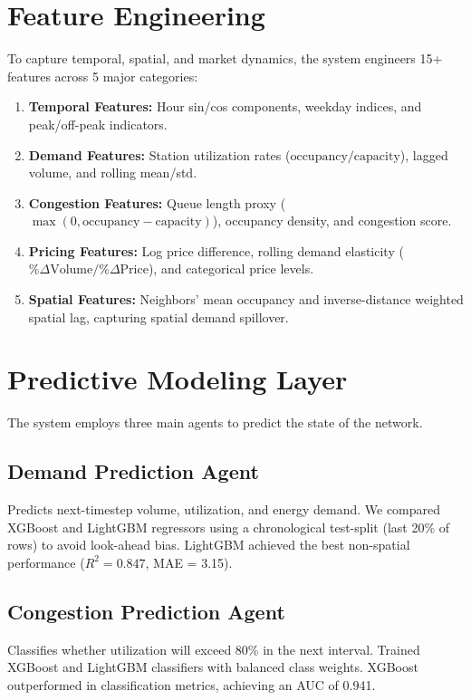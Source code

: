 \documentclass[11pt,a4paper]{article}
\begin{document}
\section{Feature Engineering}
To capture temporal, spatial, and market dynamics, the system engineers 15+ features across 5 major categories:
\begin{enumerate}
    \item \textbf{Temporal Features:} Hour sin/cos components, weekday indices, and peak/off-peak indicators.
    \item \textbf{Demand Features:} Station utilization rates ($\text{occupancy}/\text{capacity}$), lagged volume, and rolling mean/std.
    \item \textbf{Congestion Features:} Queue length proxy ($\max(0, \text{occupancy} - \text{capacity})$), occupancy density, and congestion score.
    \item \textbf{Pricing Features:} Log price difference, rolling demand elasticity ($\% \Delta \text{Volume} / \% \Delta \text{Price}$), and categorical price levels.
    \item \textbf{Spatial Features:} Neighbors' mean occupancy and inverse-distance weighted spatial lag, capturing spatial demand spillover.
\end{enumerate}

\section{Predictive Modeling Layer}
The system employs three main agents to predict the state of the network.

\subsection{Demand Prediction Agent}
Predicts next-timestep volume, utilization, and energy demand. We compared XGBoost and LightGBM regressors using a chronological test-split (last 20\% of rows) to avoid look-ahead bias. LightGBM achieved the best non-spatial performance ($R^2 = 0.847$, MAE = 3.15).

\subsection{Congestion Prediction Agent}
Classifies whether utilization will exceed 80\% in the next interval. Trained XGBoost and LightGBM classifiers with balanced class weights. XGBoost outperformed in classification metrics, achieving an AUC of 0.941.
\end{document}

